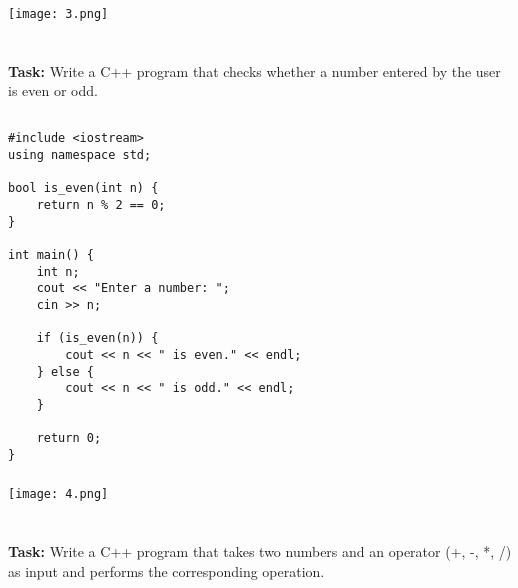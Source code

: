 \documentclass[12pt,a4paper]{article}
\begin{document}
\subsubsection{}
\begin{center}
    \texttt{[image: 3.png]}
\end{center}


\section{}
\textbf{Task:} Write a C++ program that checks whether a number entered by the user is even or odd.

\subsection{}
\begin{lstlisting}
#include <iostream>
using namespace std;

bool is_even(int n) {
    return n % 2 == 0;
}

int main() {
    int n;
    cout << "Enter a number: ";
    cin >> n;
    
    if (is_even(n)) {
        cout << n << " is even." << endl;
    } else {
        cout << n << " is odd." << endl;
    }
    
    return 0;
}
\end{lstlisting}

\subsubsection{}
\begin{center}
    \texttt{[image: 4.png]}
\end{center}


\section{}
\textbf{Task:} Write a C++ program that takes two numbers and an operator (+, -, *, /) as input and performs the corresponding operation.
\end{document}
